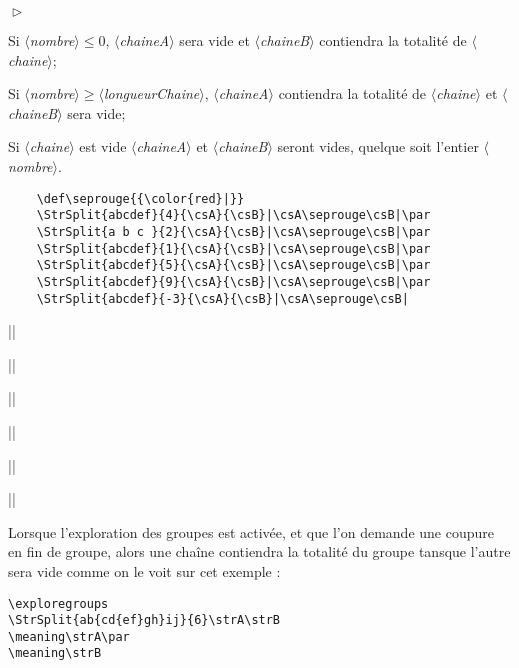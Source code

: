 \documentclass[a4paper,10pt]{article}
\newcommand\argu[1]{$\langle$\textit{#1}$\rangle$}
\newenvironment{Conditions}[1][1cm]%
{\begin{list}%
	{$\vartriangleright$}%
	{\setlength{\leftmargin}{#1}
	 \setlength{\itemsep}{0pt}
	 \setlength{\parsep}{0pt}
	 \setlength{\topsep}{2ptplus3ptminus2pt}
	}}%
{\end{list}}
\newcommand\styleexercice{\footnotesize}
\begin{document}
\begin{Conditions}
	\item Si \argu{nombre}${}\leqslant0$, \argu{chaineA} sera vide et \argu{chaineB} contiendra la totalité de \argu{chaine};
	\item Si \argu{nombre}${}\geqslant$\argu{longueurChaine}, \argu{chaineA} contiendra la totalité de \argu{chaine} et \argu{chaineB} sera vide;
	\item Si \argu{chaine} est vide \argu{chaineA} et \argu{chaineB} seront vides, quelque soit l'entier \argu{nombre}.
\end{Conditions}

\begin{minipage}[c]{0.65\linewidth}
\hfill
\begin{lstlisting}
	\def\seprouge{{\color{red}|}}
	\StrSplit{abcdef}{4}{\csA}{\csB}|\csA\seprouge\csB|\par
	\StrSplit{a b c }{2}{\csA}{\csB}|\csA\seprouge\csB|\par
	\StrSplit{abcdef}{1}{\csA}{\csB}|\csA\seprouge\csB|\par
	\StrSplit{abcdef}{5}{\csA}{\csB}|\csA\seprouge\csB|\par
	\StrSplit{abcdef}{9}{\csA}{\csB}|\csA\seprouge\csB|\par
	\StrSplit{abcdef}{-3}{\csA}{\csB}|\csA\seprouge\csB|
\end{lstlisting}%
\end{minipage}\hfill
\begin{minipage}[c]{0.35\linewidth}
	\styleexercice
	\def\seprouge{{\color{red}|}}
	|\csA\seprouge\csB|\par
	|\csA\seprouge\csB|\par
	|\csA\seprouge\csB|\par
	|\csA\seprouge\csB|\par
	|\csA\seprouge\csB|\par
	|\csA\seprouge\csB|
\end{minipage}%

\setverbdelim{|}\medskip

Lorsque l'exploration des groupes est activée, et que l'on demande une coupure en fin de groupe, alors une chaîne contiendra la totalité du groupe tansque l'autre sera vide comme on le voit sur cet exemple :\par\nobreak\smallskip
\begin{minipage}[c]{0.65\linewidth}
\hfill
\begin{lstlisting}
\exploregroups
\StrSplit{ab{cd{ef}gh}ij}{6}\strA\strB
\meaning\strA\par
\meaning\strB
\end{lstlisting}%
\end{minipage}\hfill
\begin{minipage}[c]{0.35\linewidth}
	\styleexercice
	\exploregroups
	\strA\strB
	\meaning\strA\par
	\meaning\strB
\end{minipage}%
\medskip
\end{document}

